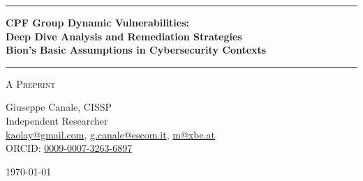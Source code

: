 \documentclass[11pt,a4paper]{article}
\begin{document}
\thispagestyle{empty}
\begin{center}

\vspace*{0.5cm}

\rule{\textwidth}{1.5pt}

\vspace{0.5cm}

{\LARGE \textbf{CPF Group Dynamic Vulnerabilities:}}\\[0.3cm]
{\LARGE \textbf{Deep Dive Analysis and Remediation Strategies}}\\[0.3cm]
{\LARGE \textbf{Bion's Basic Assumptions in Cybersecurity Contexts}}

\vspace{0.5cm}

\rule{\textwidth}{1.5pt}

\vspace{0.3cm}

{\large \textsc{A Preprint}}

\vspace{0.5cm}

{\Large Giuseppe Canale, CISSP}\\[0.2cm]
Independent Researcher\\[0.1cm]
\href{mailto:kaolay@gmail.com}{kaolay@gmail.com}, 
\href{mailto:g.canale@escom.it}{g.canale@escom.it}, 
\href{mailto:m8xbe.at}{m@xbe.at}\\[0.1cm]
ORCID: \href{https://orcid.org/0009-0007-3263-6897}{0009-0007-3263-6897}

\vspace{0.8cm}

{\large \today}

\vspace{1cm}

\end{center}
\end{document}
